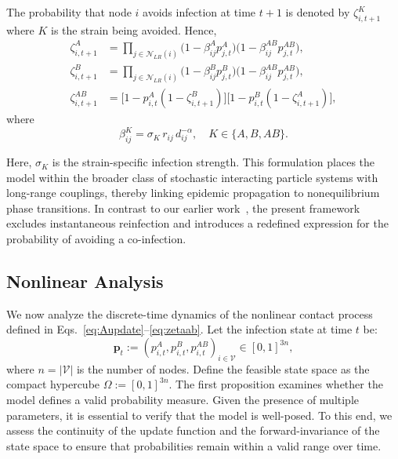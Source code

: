 \documentclass[a4paper,12pt]{scrartcl}
\theoremstyle{plain}%
\theoremstyle{definition}
\theoremstyle{remark}
\numberwithin{equation}{section}
\begin{document}
The probability that node \(i\) avoids infection at time \(t+1\) is denoted by $\zeta_{i,t+1}^K$ where $K$ is the strain being avoided. Hence,
\begin{align}
\zeta_{i,t+1}^A &= \prod_{j \in \mathcal{N}_{LR}(i)} \big(1 - \beta_{ij}^A p_{j,t}^A\big)\big(1 - \beta_{ij}^{AB} p_{j,t}^{AB}\big), \\
\zeta_{i,t+1}^B &= \prod_{j \in \mathcal{N}_{LR}(i)} \big(1 - \beta_{ij}^B p_{j,t}^B\big)\big(1 - \beta_{ij}^{AB} p_{j,t}^{AB}\big), \\
\zeta_{i,t+1}^{AB} &= \big[1 - p_{i,t}^A(1-\zeta_{i,t+1}^B)\big]\big[1 - p_{i,t}^B(1-\zeta_{i,t+1}^A)\big], \label{eq:zetaab}
\end{align}
where
\begin{equation}
 \label{eq:beta}
\beta_{ij}^K = \sigma_K\, r_{ij}\, d_{ij}^{-\alpha}, \quad K \in \{A,B,AB\}. 
\end{equation}

Here, \(\sigma_K\) is the strain-specific infection strength.
This formulation places the model within the broader class of stochastic interacting particle systems with long-range couplings, thereby linking epidemic propagation to nonequilibrium phase transitions. In contrast to our earlier work~\cite{Namugera2025contact}, the present framework excludes instantaneous reinfection and introduces a redefined expression for the probability of avoiding a co-infection.

\subsection{Nonlinear Analysis}

We now analyze the discrete-time dynamics of the nonlinear contact process defined in Eqs.~\eqref{eq:Aupdate}–\eqref{eq:zetaab}. Let the infection state at time \( t \) be:
\[
\mathbf{p}_t := \left( p_{i,t}^A, p_{i,t}^B, p_{i,t}^{AB} \right)_{i \in \mathcal{V}} \in [0,1]^{3n},
\]
where \( n = |\mathcal{V}| \) is the number of nodes. Define the feasible state space as the compact hypercube \( \Omega := [0,1]^{3n} \). The first proposition examines whether the model defines a valid probability measure. Given the presence of multiple parameters, it is essential to verify that the model is well-posed. To this end, we assess the continuity of the update function and the forward-invariance of the state space to ensure that probabilities remain within a valid range over time.
\end{document}
